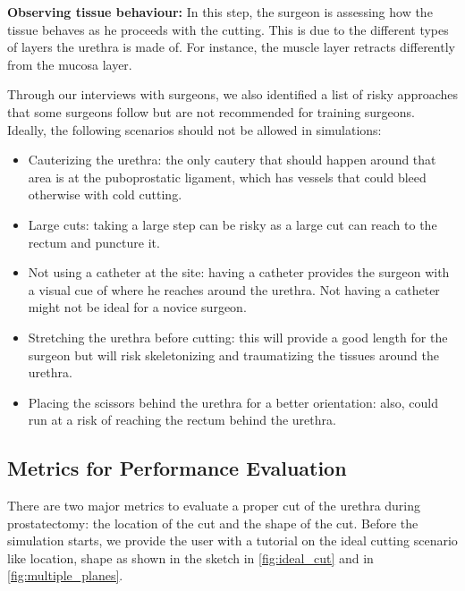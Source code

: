 \textbf{Observing tissue behaviour:} In this step, the surgeon is assessing how the tissue behaves as he proceeds with the cutting. This is due to the different types of layers the urethra is made of. For instance, the muscle layer retracts differently from the mucosa layer.

Through our interviews with surgeons, we also identified a list of risky approaches that some surgeons follow but are not recommended for training surgeons. Ideally, the following scenarios should not be allowed in simulations:
\begin{itemize}[$\star$]
  \item Cauterizing the urethra: the only cautery that should happen around that area is at the puboprostatic ligament, which has vessels that could bleed otherwise with cold cutting.
  \item Large cuts: taking a large step can be risky as a large cut can reach to the rectum and puncture it.
  \item Not using a catheter at the site: having a catheter provides the surgeon with a visual cue of where he reaches around the urethra. Not having a catheter might not be ideal for a novice surgeon.
  \item Stretching the urethra before cutting: this will provide a good length for the surgeon but will risk skeletonizing and traumatizing the tissues around the urethra.
  \item Placing the scissors behind the urethra for a better orientation: also, could run at a risk of reaching the rectum behind the urethra.
\end{itemize}

\subsection{Metrics for Performance Evaluation}
There are two major metrics to evaluate a proper cut of the urethra during prostatectomy: the location of the cut and the shape of the cut. Before the simulation starts, we provide the user with a tutorial on the ideal cutting scenario like location, shape as shown in the sketch in \autoref{fig:ideal_cut} and in \autoref{fig:multiple_planes}.


